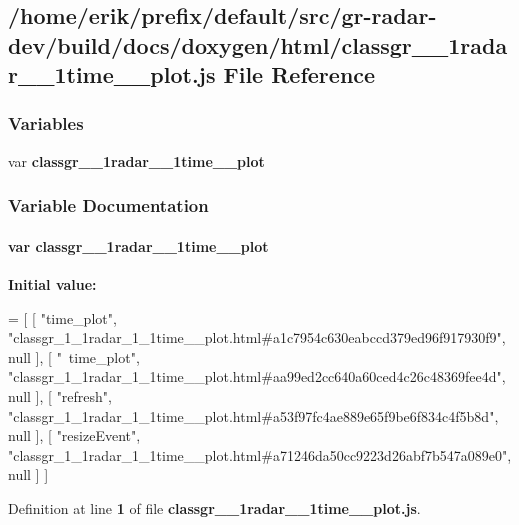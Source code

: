 \subsection{/home/erik/prefix/default/src/gr-\/radar-\/dev/build/docs/doxygen/html/classgr\+\_\+\_\+1radar\+\_\+\_\+1time\+\_\+\+\_\+plot.js File Reference}
\label{classgr__1__1radar__1__1time____plot_8js}
\subsubsection*{Variables}
\begin{DoxyCompactItemize}
\item 
var {\bf classgr\+\_\+\_\+1radar\+\_\+\_\+1time\+\_\+\+\_\+plot}
\end{DoxyCompactItemize}


\subsubsection{Variable Documentation}
\paragraph[{classgr\+\_\+1\+\_\+1radar\+\_\+1\+\_\+1time\+\_\+\+\_\+plot}]{\setlength{\rightskip}{0pt plus 5cm}var classgr\+\_\+\_\+1radar\+\_\+\_\+1time\+\_\+\+\_\+plot}\label{classgr__1__1radar__1__1time____plot_8js_ae021b877db5bc4589c2a0803986493a6}
{\bfseries Initial value\+:}
\begin{DoxyCode}
=
[
    [ \textcolor{stringliteral}{"time\_plot"}, \textcolor{stringliteral}{"classgr\_1\_1radar\_1\_1time\_\_plot.html#a1c7954c630eabccd379ed96f917930f9"}, null ],
    [ \textcolor{stringliteral}{"~time\_plot"}, \textcolor{stringliteral}{"classgr\_1\_1radar\_1\_1time\_\_plot.html#aa99ed2cc640a60ced4c26c48369fee4d"}, null ],
    [ \textcolor{stringliteral}{"refresh"}, \textcolor{stringliteral}{"classgr\_1\_1radar\_1\_1time\_\_plot.html#a53f97fc4ae889e65f9be6f834c4f5b8d"}, null ],
    [ \textcolor{stringliteral}{"resizeEvent"}, \textcolor{stringliteral}{"classgr\_1\_1radar\_1\_1time\_\_plot.html#a71246da50cc9223d26abf7b547a089e0"}, null ]
]
\end{DoxyCode}


Definition at line {\bf 1} of file {\bf classgr\+\_\+\_\+1radar\+\_\+\_\+1time\+\_\+\+\_\+plot.\+js}.

